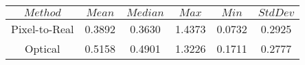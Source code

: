 \begin{table}[h]
\centering
\begin{tabular}{|c|c|c|c|c|c|}
\hline
$Method$ & $Mean$ & $Median$ & $Max$ & $Min$ & $StdDev$ \\
\hline
Pixel-to-Real & 0.3892 & 0.3630 & 1.4373 & 0.0732 & 0.2925 \\
\hline
Optical & 0.5158 & 0.4901 & 1.3226 & 0.1711 & 0.2777 \\
\hline
\end{tabular}
\end{table}
